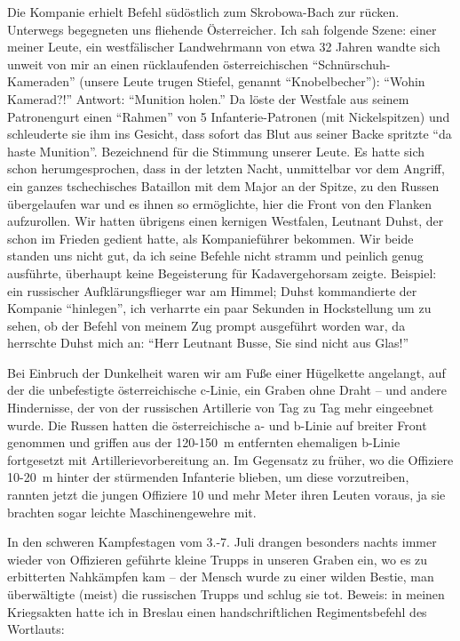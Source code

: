 Die Kompanie erhielt Befehl südöstlich zum Skrobowa-Bach zur rücken. Unterwegs begegneten uns fliehende Österreicher. Ich sah folgende Szene: einer meiner Leute, ein westfälischer Landwehrmann von etwa 32 Jahren wandte sich unweit von mir an einen rücklaufenden österreichischen \enquote{Schnür\-schuh-Kameraden} (unsere Leute trugen Stiefel, genannt \enquote{Knobelbecher}): \enquote{Wohin Kamerad?!} Antwort: \enquote{Munition holen.} Da löste der Westfale aus seinem Patronengurt einen \enquote{Rahmen} von 5 Infanterie-Patronen (mit Nickelspitzen) und schleuderte sie ihm ins Gesicht, dass sofort das Blut aus seiner Backe spritzte \enquote{da haste Munition}. Bezeichnend für die Stimmung unserer Leute. Es hatte sich schon herumgesprochen, dass in der letzten Nacht, unmittelbar vor dem Angriff, ein ganzes tschechisches Bataillon mit dem Major an der Spitze, zu den Russen übergelaufen war und es ihnen so ermöglichte, hier die Front von den Flanken aufzurollen. Wir hatten übrigens einen kernigen Westfalen, Leutnant Duhst, der schon im Frieden gedient hatte, als Kompanieführer bekommen. Wir beide standen uns nicht gut, da ich seine Befehle nicht stramm und peinlich genug ausführte, überhaupt keine Begeisterung für Kadavergehorsam zeigte. Beispiel: ein russischer Aufklärungsflieger war am Himmel; Duhst kommandierte der Kompanie \enquote{hinlegen}, ich verharrte ein paar Sekunden in Hockstellung um zu sehen, ob der Befehl von meinem Zug prompt ausgeführt worden war, da herrschte Duhst mich an: \enquote{Herr Leutnant Busse, Sie sind nicht aus Glas!}

Bei Einbruch der Dunkelheit waren wir am Fuße einer Hügelkette angelangt, auf der die unbefestigte österreichische c-Linie, ein Graben ohne Draht -- und andere Hindernisse, der von der russischen Artillerie von Tag zu Tag mehr eingeebnet wurde. Die Russen hatten die österreichische a- und b-Linie auf breiter Front genommen und griffen aus der 120-150~m entfernten ehemaligen b-Linie fortgesetzt mit Artillerievorbereitung an. Im Gegensatz zu früher, wo die Offiziere 10-20~m hinter der stürmenden Infanterie blieben, um diese vorzutreiben, rannten jetzt die jungen Offiziere 10 und mehr Meter ihren Leuten voraus, ja sie brachten sogar leichte Maschinengewehre mit.

In den schweren Kampfestagen vom 3.-7. Juli drangen besonders nachts immer wieder von Offizieren geführte kleine Trupps in unseren Graben ein, wo es zu erbitterten Nahkämpfen kam -- der Mensch wurde zu einer wilden Bestie, man überwältigte (meist) die russischen Trupps und schlug sie tot. Beweis: in meinen Kriegsakten hatte ich in Breslau einen handschriftlichen Regimentsbefehl des Wortlauts:


